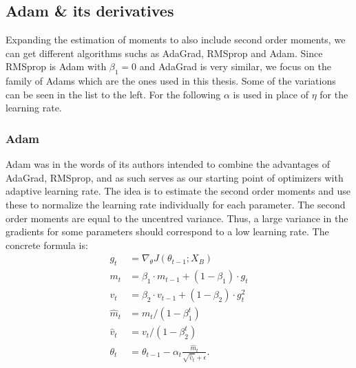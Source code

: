 \subsection{Adam \& its derivatives}
Expanding the estimation of moments to also include second order moments, we can get different algorithms suchs as AdaGrad, RMSprop and \ac{Adam}. 
Since RMSprop is Adam with $\beta_1 = 0$ and AdaGrad is very similar, we focus on the family of \acp{Adam} which are the ones used in this thesis.
Some of the variations can be seen in the list to the left. For the following $\alpha$ is used in place of $\eta$ for the learning rate.
\subsubsection{Adam}
\ac{Adam} was in the words of its authors \cite{kingmaAdamMethodStochastic2017} intended to combine the advantages of AdaGrad, RMSprop, and as such serves as our starting point of optimizers with adaptive learning rate.
The idea is to estimate the second order moments and use these to normalize the learning rate individually for each parameter. 
The second order moments are equal to the uncentred variance.
Thus, a large variance in the gradients for some parameters should correspond to a low learning rate.
The concrete formula is:
\begin{align}
	g_t &= \nabla_\theta J(\theta_{t-1}; X_B) \\
	m_t &= \beta_1 \cdot m_{t-1} + (1-\beta_1) \cdot g_t \\
	v_t &= \beta_2 \cdot v_{t-1} + (1-\beta_2) \cdot g_{t}^2 \\
	\hat{m}_t &= m_t / (1-\beta_{1}^t) \\
	\hat{v}_t &= v_t / (1-\beta_{2}^t) \\
	\theta_t  &= \theta_{t-1} - \alpha_t \frac{\hat{m}_t}{\sqrt{\hat{v}_t} + \epsilon}.
\end{align}


